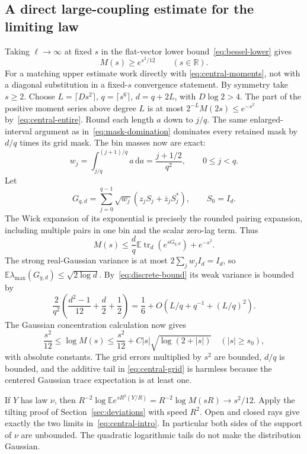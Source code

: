 \documentclass[11pt,reqno]{amsart}
\numberwithin{equation}{section}
\newcommand{\R}{\mathbb R}
\newcommand{\E}{\mathbb E}
\newcommand{\tr}{\operatorname{tr}}
\newcommand{\dd}{\,\mathrm d}
\newcommand{\abs}[1]{\lvert#1\rvert}
\begin{document}
\subsection*{A direct large-coupling estimate for the limiting law}

Taking $\ell\to\infty$ at fixed $s$ in the flat-vector lower
bound~\eqref{eq:bessel-lower} gives
\begin{equation}\label{eq:central-lower}
 M(s)\ge e^{s^2/12}\qquad(s\in\R).
\end{equation}
For a matching upper estimate work directly with
\eqref{eq:central-moments}, not with a diagonal substitution
in a fixed-$s$ convergence statement. By symmetry take $s\ge2$.
Choose $L=\lceil Ds^2\rceil$, $q=\lceil s^6\rceil$,
$d=q+2L$, with $D\log2>4$. The part of the positive moment
series above degree $L$ is at most
$2^{-L}M(2s)\le e^{-s^2}$ by~\eqref{eq:central-entire}.
Round each length $a$ down to $j/q$. The same enlarged-interval
argument as in~\eqref{eq:mask-domination} dominates every
retained mask by $d/q$ times its grid mask. The bin masses now
are exact:
\[
 w_j=\int_{j/q}^{(j+1)/q}a\dd a=\frac{j+1/2}{q^2},
 \qquad 0\le j<q.
\]
Let
\[
 G_{q,d}=\sum_{j=0}^{q-1}\sqrt{w_j}
                  (z_jS_j+\overline z_jS_j^*),\qquad S_0=I_d.
\]
The Wick expansion of its exponential is precisely the rounded
pairing expansion, including multiple pairs in one bin and the
scalar zero-lag term. Thus
\begin{equation}\label{eq:central-grid}
 M(s)\le\frac dq\E\tr_d(e^{sG_{q,d}})+e^{-s^2}.
\end{equation}
The strong real-Gaussian variance is at most
$2\sum_jw_jI_d=I_d$, so $\E\lambda_{\max}(G_{q,d})
\le\sqrt{2\log d}$. By~\eqref{eq:discrete-bound} its weak variance
is bounded by
\[
 \frac2{q^2}\left(\frac{d^2-1}{12}+\frac d2+\frac12\right)
       =\frac16+O(L/q+q^{-1}+(L/q)^2).
\]
The Gaussian concentration calculation now gives
\begin{equation}\label{eq:central-pressure}
 \frac{s^2}{12}\le\log M(s)
       \le\frac{s^2}{12}+C\abs s\sqrt{\log(2+\abs s)}
       \quad(\abs s\ge s_0),
\end{equation}
with absolute constants. The grid errors multiplied by $s^2$
are bounded, $d/q$ is bounded, and the additive tail in
\eqref{eq:central-grid} is harmless because the centered
Gaussian trace expectation is at least one.

If $Y$ has law $\nu$, then
$R^{-2}\log\E e^{sR^2(Y/R)}=R^{-2}\log M(sR)\to s^2/12$.
Apply the tilting proof of Section~\ref{sec:deviations} with
speed $R^2$. Open and closed rays give exactly the two limits
in~\eqref{eq:central-intro}. In particular both sides of the
support of $\nu$ are unbounded. The quadratic logarithmic
tails do not make the distribution Gaussian.
\end{document}
